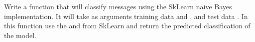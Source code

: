 \begin{problem}\label{prob:naivebayes:sklearn}
Write a function that will classify messages using the SkLearn naive Bayes implementation.
It will take as arguments training data  and , and test data .
In this function use the  and  from SkLearn and return the predicted classification of the model.
\end{problem}
